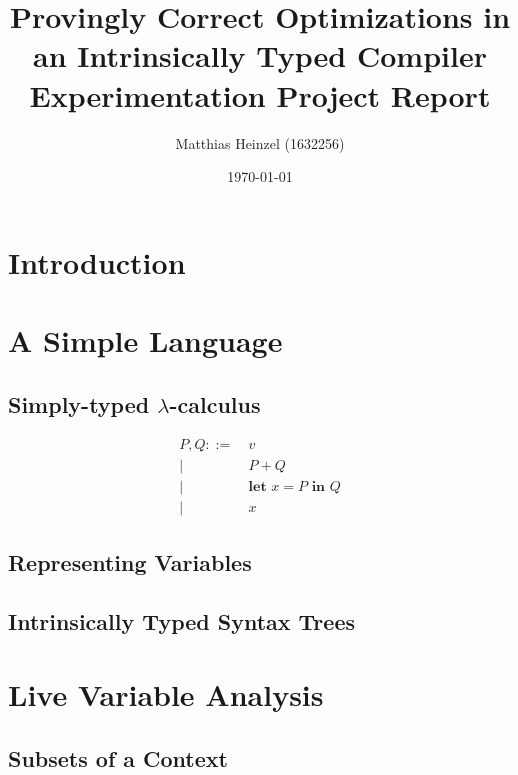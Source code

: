 \documentclass[11pt,a4paper]{article}
\title{Provingly Correct Optimizations in an Intrinsically Typed Compiler\\
  \vspace{1cm}
  \large Experimentation Project Report}
\author{Matthias Heinzel (1632256)}
\date{\today}
\begin{document}
\maketitle
\tableofcontents


\section{Introduction}


\section{A Simple Language}

\subsection{Simply-typed $\lambda$-calculus}

\begin{align*}
  P, Q ::=&\ v
  \\ \big|&\ P + Q
  \\ \big|&\ \textbf{let } x = P \textbf{ in } Q
  \\ \big|&\ x
\end{align*}

\subsection{Representing Variables}

\subsection{Intrinsically Typed Syntax Trees}

\CodeLangSyntax


\section{Live Variable Analysis}

\subsection{Subsets of a Context}
\end{document}
